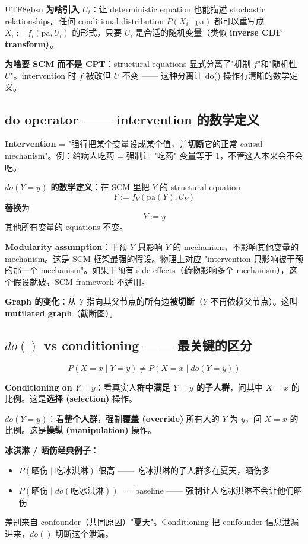 \documentclass[11pt]{article}
\begin{document}
\begin{CJK}{UTF8}{gbsn}
\textbf{为啥引入 $U_i$}：让 deterministic equation 也能描述 stochastic relationships。任何 conditional distribution $P(X_i \mid \text{pa})$ 都可以重写成 $X_i := f_i(\text{pa}, U_i)$ 的形式，只要 $U_i$ 是合适的随机变量（类似 \textbf{inverse CDF transform}）。

\textbf{为啥要 SCM 而不是 CPT}：structural equations 显式分离了"机制 $f$"和"随机性 $U$"。intervention 时 $f$ 被改但 $U$ 不变 —— 这种分离让 do() 操作有清晰的数学定义。

\subsection{do operator —— intervention 的数学定义}

\textbf{Intervention} = "强行把某个变量设成某个值，并\textbf{切断}它的正常 causal mechanism"。例：给病人吃药 = 强制让 "吃药" 变量等于 1，不管这人本来会不会吃。

\textbf{$do(Y = y)$ 的数学定义}：在 SCM 里把 $Y$ 的 structural equation
\[
Y := f_Y(\text{pa}(Y), U_Y)
\]
\textbf{替换}为
\[
Y := y
\]
其他所有变量的 equations 不变。

\textbf{Modularity assumption}：干预 $Y$ \textbf{只}影响 $Y$ 的 mechanism，不影响其他变量的 mechanism。这是 SCM 框架最强的假设。物理上对应 "intervention 只影响被干预的那一个 mechanism"。如果干预有 side effects（药物影响多个 mechanism），这个假设就破，SCM framework 不适用。

\textbf{Graph 的变化}：从 $Y$ 指向其父节点的所有边\textbf{被切断}（$Y$ 不再依赖父节点）。这叫 \textbf{mutilated graph}（截断图）。

\subsection{$do()$ vs conditioning —— 最关键的区分}

\[
\boxed{P(X = x \mid Y = y) \neq P(X = x \mid do(Y = y))}
\]

\textbf{Conditioning on $Y = y$}：看真实人群中\textbf{满足 $Y = y$ 的子人群}，问其中 $X = x$ 的比例。这是\textbf{选择 (selection)} 操作。

\textbf{$do(Y = y)$}：看\textbf{整个人群}，强制\textbf{覆盖 (override)} 所有人的 $Y$ 为 $y$，问 $X = x$ 的比例。这是\textbf{操纵 (manipulation)} 操作。

\textbf{冰淇淋 / 晒伤经典例子}：
\begin{itemize}[nosep]
  \item $P(\text{晒伤} \mid \text{吃冰淇淋})$ 很高 —— 吃冰淇淋的子人群多在夏天，晒伤多
  \item $P(\text{晒伤} \mid do(\text{吃冰淇淋}))$ $=$ baseline —— 强制让人吃冰淇淋不会让他们晒伤
\end{itemize}
差别来自 confounder（共同原因）"夏天"。Conditioning 把 confounder 信息泄漏进来，$do()$ 切断这个泄漏。


\end{CJK}
\end{document}
